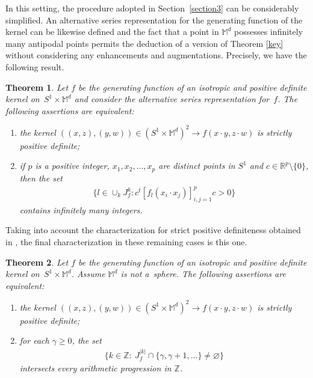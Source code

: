 \documentclass[pdftex]{sigma}
\numberwithin{equation}{section}
\newtheorem{Theorem}{Theorem}[section]
\begin{document}
In this setting, the procedure adopted in Section~\ref{section3} can be considerably simplif\/ied. An alternative series representation for the generating function of the kernel can be likewise def\/ined and the fact that a point in $\mathbb{M}^d$ possesses inf\/initely many antipodal points permits the deduction of a version of Theorem \ref{key} without considering any enhancements and augmentations. Precisely, we have the following result.

\begin{Theorem} \label{key1}
Let $f$ be the generating function of an isotropic and positive definite kernel on~\mbox{$S^1 \times \mathbb{M}^d$} and consider the alternative series representation for~$f$. The following assertions are equivalent:
\begin{enumerate}\itemsep=0pt
\item[$(i)$] the kernel $((x,z), (y,w)) \in (S^1 \times \mathbb{M}^d)^2 \to f(x \cdot y, z \cdot w)$ is strictly positive definite;
\item[$(ii)$] if $p$ is a positive integer, $x_1, x_2, \ldots, x_p$ are distinct points in $S^1$ and $c\in \mathbb{R}^p\setminus\{0\}$, then the set
\begin{gather*}
\big\{l\in \cup_{k}J_f^k \colon c^{t} [f_l(x_i \cdot x_j) ]_{i,j=1}^p c>0\big\}
\end{gather*}
contains infinitely many integers.
\end{enumerate}
\end{Theorem}

Taking into account the characterization for strict positive def\/initeness obtained in \cite{barbosa}, the f\/inal characterization in these remaining cases is this one.

\begin{Theorem}
Let $f$ be the generating function of an isotropic and positive definite kernel on~\mbox{$S^1 \times \mathbb{M}^d$}. Assume $\mathbb{M}^d$ is not a~sphere. The following assertions are equivalent:
\begin{enumerate}\itemsep=0pt
\item[$(i)$] the kernel $((x,z), (y,w)) \in (S^1 \times \mathbb{M}^d)^2 \to f(x \cdot y, z \cdot w)$ is strictly positive definite;
\item[$(ii)$] for each $\gamma \geq 0$, the set
\begin{gather*}
\big\{k\in \mathbb{Z}\colon \ J_f^{|k|} \cap \{\gamma,\gamma+1,\ldots\}\neq \varnothing\big\}
\end{gather*}
intersects every arithmetic progression in $\mathbb{Z}$.
\end{enumerate}
\end{Theorem}
\end{document}
